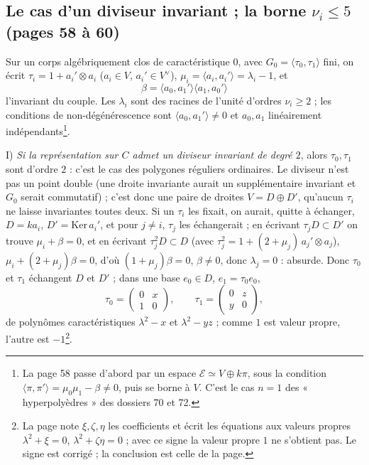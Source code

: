 \documentclass[11pt,a4paper]{article}
\begin{document}
\subsection*{Le cas d'un diviseur invariant ; la borne $\nu_i \leq 5$ (pages 58 à 60)}

Sur un corps algébriquement clos de caractéristique $0$, avec $G_0 = \langle
\tau_0, \tau_1\rangle$ fini, on écrit $\tau_i = 1 + a_i' \otimes a_i$ ($a_i \in
V$, $a_i' \in V^\vee$), $\mu_i = \langle a_i, a_i'\rangle = \lambda_i - 1$, et
\[
  \beta = \langle a_0, a_1'\rangle\langle a_1, a_0'\rangle
\]
l'invariant du couple. Les $\lambda_i$ sont des racines de l'unité d'ordres
$\nu_i \geq 2$ ; les conditions de non-dégénérescence sont $\langle a_0,
a_1'\rangle \neq 0$ et $a_0, a_1$ linéairement indépendants\footnote{La page 58
passe d'abord par un espace $\mathcal{E} \simeq V \oplus k\pi$, sous la
condition $\langle \pi, \pi'\rangle = \mu_0\mu_1 - \beta \neq 0$, puis se borne
à $V$. C'est le cas $n = 1$ des « hyperpolyèdres » des dossiers 70 et 72.}.

I) \emph{Si la représentation sur $C$ admet un diviseur invariant de degré
$2$}, alors $\tau_0, \tau_1$ sont d'ordre $2$ : c'est le cas des polygones
réguliers ordinaires. Le diviseur n'est pas un point double (une droite
invariante aurait un supplémentaire invariant et $G_0$ serait commutatif) ;
c'est donc une paire de droites $V = D \oplus D'$, qu'aucun $\tau_i$ ne
laisse invariantes toutes deux. Si un $\tau_i$ les fixait, on aurait, quitte à
échanger, $D = ka_i$, $D' = \mathrm{Ker}\, a_i'$, et pour $j \neq i$, $\tau_j$
les échangerait ; en écrivant $\tau_j D \subset D'$ on trouve $\mu_i + \beta =
0$, et en écrivant $\tau_j^2 D \subset D$ (avec $\tau_j^2 = 1 + (2 + \mu_j)\,
a_j' \otimes a_j$), $\mu_i + (2 + \mu_j)\beta = 0$, d'où $(1 + \mu_j)\beta = 0$,
$\beta \neq 0$, donc $\lambda_j = 0$ : absurde. Donc $\tau_0$ et $\tau_1$
échangent $D$ et $D'$ ; dans une base $e_0 \in D$, $e_1 = \tau_0 e_0$,
\[
  \tau_0 = \begin{pmatrix} 0 & x \\ 1 & 0 \end{pmatrix}, \qquad
  \tau_1 = \begin{pmatrix} 0 & z \\ y & 0 \end{pmatrix},
\]
de polynômes caractéristiques $\lambda^2 - x$ et $\lambda^2 - yz$ ; comme $1$
est valeur propre, l'autre est $-1$\footnote{La page note $\xi, \zeta, \eta$
les coefficients et écrit les équations aux valeurs propres $\lambda^2 + \xi =
0$, $\lambda^2 + \zeta\eta = 0$ ; avec ce signe la valeur propre $1$ ne
s'obtient pas. Le signe est corrigé ; la conclusion est celle de la page.}.
\end{document}
